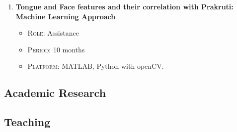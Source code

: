 \documentclass[11pt,a4paper,sans]{moderncv} %
\begin{document}
{\begin{enumerate}
\begin{itemize}
\item \textsc{Key Result Areas:}
\begin{itemize}
\item Read literature on Ayurveda and understood basics theory and terminology of Ayurveda.
\item Implemented preprocessing and signal conditioning modules for pulse signals. 
\item Implemented time and frequency domain features extraction modules.
\item Guided two intern M.Sc. projects related with pulse parameter and rate variability with machine learning approach.
\end{itemize}
\end{itemize}
\item \textbf{Tongue and Face features and their correlation with Prakruti: Machine Learning Approach}
\begin{itemize}
\item \textsc{Role:} Assistance
\item \textsc{Period:} 10 months
\item \textsc{Platform:} MATLAB, Python with openCV. 
\end{itemize}
\end{enumerate}}



\subsection{\textbf{Academic Research}}


\subsection{\textbf{Teaching}}
\end{document}
